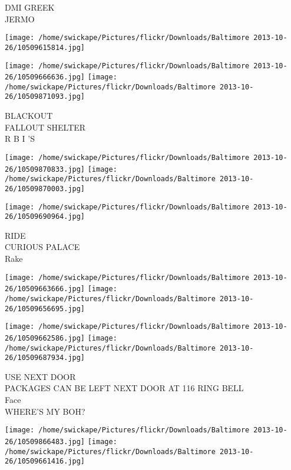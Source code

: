 \documentclass[10pt,letterpaper]{article}
\begin{document}
DMI GREEK\\
JERMO\\
\pagebreak

\texttt{[image: /home/swickape/Pictures/flickr/Downloads/Baltimore 2013-10-26/10509615814.jpg]}

\vspace{0.25in}
\texttt{[image: /home/swickape/Pictures/flickr/Downloads/Baltimore 2013-10-26/10509666636.jpg]}
\texttt{[image: /home/swickape/Pictures/flickr/Downloads/Baltimore 2013-10-26/10509871093.jpg]}

BLACKOUT\\
FALLOUT SHELTER\\
R B I 'S\\
\pagebreak

\texttt{[image: /home/swickape/Pictures/flickr/Downloads/Baltimore 2013-10-26/10509870833.jpg]}
\texttt{[image: /home/swickape/Pictures/flickr/Downloads/Baltimore 2013-10-26/10509870003.jpg]}

\vspace{0.25in}
\texttt{[image: /home/swickape/Pictures/flickr/Downloads/Baltimore 2013-10-26/10509690964.jpg]}

RIDE\\
CURIOUS PALACE\\
Rake\\
\pagebreak

\texttt{[image: /home/swickape/Pictures/flickr/Downloads/Baltimore 2013-10-26/10509663666.jpg]}
\texttt{[image: /home/swickape/Pictures/flickr/Downloads/Baltimore 2013-10-26/10509656695.jpg]}

\texttt{[image: /home/swickape/Pictures/flickr/Downloads/Baltimore 2013-10-26/10509662586.jpg]}
\texttt{[image: /home/swickape/Pictures/flickr/Downloads/Baltimore 2013-10-26/10509687934.jpg]}

USE NEXT DOOR\\
PACKAGES CAN BE LEFT NEXT DOOR AT 116 RING BELL\\
Face\\
WHERE'S MY BOH?\\
\pagebreak

\texttt{[image: /home/swickape/Pictures/flickr/Downloads/Baltimore 2013-10-26/10509866483.jpg]}
\texttt{[image: /home/swickape/Pictures/flickr/Downloads/Baltimore 2013-10-26/10509661416.jpg]}
\end{document}
